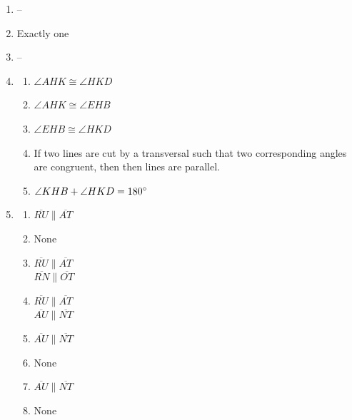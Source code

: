 \documentclass{article}
\begin{document}
\begin{enumerate}
\begin{enumerate}
	\end{enumerate}
	
\item --

\item Exactly one

\item --

\item

	\begin{enumerate}
	
	\item $\angle AHK \cong \angle HKD$
	
	\item $\angle AHK \cong \angle EHB$
	
	\item $\angle EHB \cong \angle HKD$
	
	\item If two lines are cut by a transversal such that two corresponding angles are congruent, then then lines are parallel.
	
	\item $\angle KHB + \angle HKD = 180 \degree$
	
	\end{enumerate}
	
\item

	\begin{enumerate}
	
	\item $\overline{RU} \parallel \overline{AT}$
	
	\item None
	
	\item $\overline{RU} \parallel \overline{AT}$ \\
		$\overline{RN} \parallel \overline{OT}$
	
	\item $\overline{RU} \parallel \overline{AT}$ \\
		$\overline{AU} \parallel \overline{NT}$
	
	\item $\overline{AU} \parallel \overline{NT}$
	
	\item None
	
	\item $\overline{AU} \parallel \overline{NT}$
	
	\item None
	

\end{enumerate}
\end{enumerate}
\end{document}
